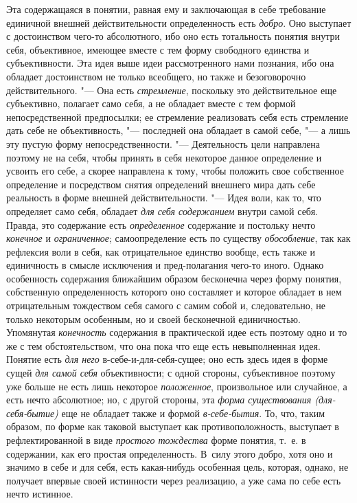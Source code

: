 Эта содержащаяся в понятии, равная ему и заключающая в себе
требование единичной внешней действительности определенность
есть {\em добро}.
Оно выступает с достоинством чего-то абсолютного, ибо оно
есть тотальность понятия внутри себя, объективное, имеющее вместе с тем
форму свободного единства и субъективности. Эта идея выше идеи
рассмотренного нами познания, ибо она обладает достоинством не только
всеобщего, но также и безоговорочно действительного. "--- Она
есть {\em стремление},
поскольку это действительное еще субъективно, полагает само
себя, а не обладает вместе с тем формой непосредственной предпосылки; ее
стремление реализовать себя есть стремление дать себе не объективность, "---
последней она обладает в самой себе, "--- а лишь
эту пустую форму непосредственности. "--- Деятельность цели
направлена поэтому не на себя, чтобы принять в себя некоторое данное
определение и усвоить его себе, а скорее направлена к тому, чтобы положить
свое собственное определение и посредством снятия определений внешнего мира
дать себе реальность в форме внешней действительности. "---
Идея воли, как то, что определяет само себя, обладает
{\em для себя содержанием}
внутри самой себя. Правда, это содержание есть
{\em определенное}
содержание и постольку нечто
{\em конечное} и
{\em ограниченное};
самоопределение есть по существу
{\em обособление}, так
как рефлексия воли в себя, как отрицательное единство вообще, есть также и
единичность в смысле исключения и пред-полагания чего-то
иного. Однако особенность содержания ближайшим образом бесконечна через
форму понятия, собственную определенность которого оно составляет и которое
обладает в нем отрицательным тождеством себя самого с самим собой и,
следовательно, не только некоторым особенным, но и своей бесконечной
единичностью. Упомянутая
{\em конечность}
содержания в практической идее есть поэтому одно и то же с
тем обстоятельством, что она пока что еще есть невыполненная идея. Понятие
есть {\em для него}
в-себе-и-для-себя-сущее; оно есть здесь идея в форме сущей
{\em для самой себя}
объективности; с одной стороны, субъективное поэтому уже
больше не есть лишь некоторое
{\em положенное},
произвольное или случайное, а есть нечто абсолютное; но, с
другой стороны, эта {\em форма
существования (для-себя-бытие)} еще не обладает также и
формой {\em в-себе-бытия}.
То, что, таким образом, по форме как таковой выступает как
противоположность, выступает в рефлектированной в виде
{\em простого тождества}
форме понятия, т.~е. в содержании, как его простая
определенность. В~силу этого добро, хотя оно и значимо в себе и для себя,
есть какая-нибудь особенная цель, которая, однако, не получает впервые
своей истинности через реализацию, а уже сама по себе есть нечто
истинное.

